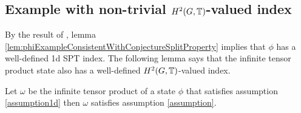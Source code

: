 \documentclass[11pt,a4paper,twoside]{article}
\numberwithin{equation}{section}
\begin{document}
	\subsection{Example with non-trivial \texorpdfstring{$H^2(G,\mathbb T)$}{}-valued index}\label{sec:ExampleOneTranslation}
	By the result of \cite{ogata2019classification}, lemma \ref{lem:phiExampleConsistentWithConjectureSplitProperty} implies that $\phi$ has a well-defined 1d SPT index. The following lemma says that the infinite tensor product state also has a well-defined $H^2(G,\mathbb T)$-valued index.
	\begin{lemma}\label{lem:TensorProductStateHasWellDefinedH^2Index}
		Let $\omega$ be the infinite tensor product of a state $\phi$ that satisfies assumption \ref{assumption1d} then $\omega$ satisfies assumption \ref{assumption}.
	\end{lemma}
\end{document}
